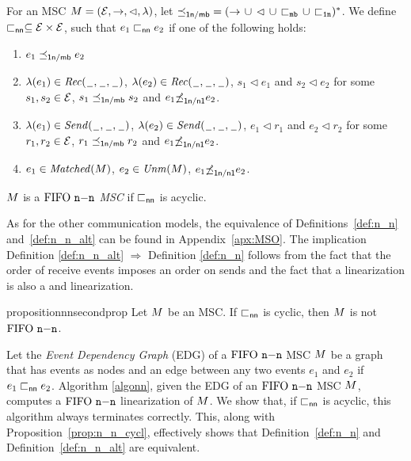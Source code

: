 \begin{definition} [$\nn$ alternative]\label{def:n_n_alt}
	For an MSC $M = (\mathcal{E},\to,\lhd,\lambda)$, let ${\preceq_{\mathsf{1n/\mathsf{mb}}}} = ({\to} \,\cup\, {\lhd} \,\cup\, {\sqsubset_{\mathtt{mb}}} \,\cup\, {\sqsubset_{\mathtt{1n}}})^\ast$. We define  $\sqsubset_{\mathsf{nn}} \subseteq \mathcal{E} \times \mathcal{E}$,  such that $e_1 \sqsubset_{\mathsf{nn}} e_2$ if one of the following holds:
	\begin{enumerate}%
		\item $e_1 \preceq_{\mathsf{1n/\mathsf{mb}}} e_2$
		\item $\lambda(e_1) \in {\mathit{Rec}(\hspace{0.1em}\underline{\hspace{0.5em}}\hspace{0.1em},\hspace{0.1em}\underline{\hspace{0.5em}}\hspace{0.1em},\hspace{0.1em}\underline{\hspace{0.5em}}\hspace{0.1em})}$, $\lambda(e_2) \in {\mathit{Rec}(\hspace{0.1em}\underline{\hspace{0.5em}}\hspace{0.1em},\hspace{0.1em}\underline{\hspace{0.5em}}\hspace{0.1em},\hspace{0.1em}\underline{\hspace{0.5em}}\hspace{0.1em})}$, $s_1 \lhd e_1$ and $s_2 \lhd e_2$ for some $s_1,s_2 \in \mathcal{E}$, $s_1 \preceq_{\mathsf{1n/\mathsf{mb}}} s_2$ and $e_1 {\not\preceq}_{\mathsf{1n/n1}} e_2$.
		\item $\lambda(e_1) \in {\mathit{Send}(\hspace{0.1em}\underline{\hspace{0.5em}}\hspace{0.1em},\hspace{0.1em}\underline{\hspace{0.5em}}\hspace{0.1em},\hspace{0.1em}\underline{\hspace{0.5em}}\hspace{0.1em})}$, $\lambda(e_2) \in {\mathit{Send}(\hspace{0.1em}\underline{\hspace{0.5em}}\hspace{0.1em},\hspace{0.1em}\underline{\hspace{0.5em}}\hspace{0.1em},\hspace{0.1em}\underline{\hspace{0.5em}}\hspace{0.1em})}$, $e_1 \lhd r_1$ and $e_2 \lhd r_2$ for some $r_1,r_2 \in \mathcal{E}$, $r_1 \preceq_{\mathsf{1n/\mathsf{mb}}} r_2$ and $e_1 {\not\preceq}_{\mathsf{1n/n1}} e_2$.
		\item $e_1 \in \mathit{Matched}(M)$, $e_2 \in \mathit{Unm}(M)$, $e_1 {\not\preceq}_{\mathsf{1n/n1}} e_2$.
	\end{enumerate}

	$M $ is a \emph{$\nn$ MSC}
	if ${\sqsubset_{\mathsf{nn}}}$ is acyclic.
\end{definition}

As for the other communication models,
the equivalence of 
Definitions~\ref{def:n_n} and~\ref{def:n_n_alt}
can be found in Appendix~\ref{apx:MSO}. 
The implication Definition \ref{def:n_n_alt} $\Rightarrow$ Definition \ref{def:n_n} follows from the fact that the order of receive events imposes an order on sends and the fact that a \nn linearization is also a \mb and \onen linearization.
\begin{restatable}{proposition}{nnsecondprop}
\label{prop:n_n_cycl}
	Let $M$ be an MSC. If $\sqsubset_{\mathsf{nn}}$ is cyclic, then $M$ is not $\nn$.
\end{restatable}

Let the \emph{Event Dependency Graph} (EDG) of a $\nn$ MSC $M$ be a graph that has events as nodes and an edge between any two events $e_1$ and $e_2$ if $e_1 \sqsubset_{\mathsf{nn}} e_2$. Algorithm  \ref {algonn}, given the EDG of an $\nn$ MSC $M$, computes a $\nn$ linearization of $M$. We  show that, if $\sqsubset_{\mathsf{nn}}$ is acyclic, this algorithm always terminates correctly. This, along with Proposition~\ref{prop:n_n_cycl}, effectively shows that Definition~\ref{def:n_n} and Definition~\ref{def:n_n_alt} are equivalent.

